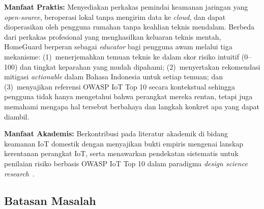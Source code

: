 \documentclass[conference]{IEEEtran}
\begin{document}
\textbf{Manfaat Praktis:} Menyediakan perkakas pemindai keamanan
jaringan yang \textit{open-source}, beroperasi lokal tanpa mengirim data
ke \textit{cloud}, dan dapat dioperasikan oleh pengguna rumahan tanpa
keahlian teknis mendalam. Berbeda dari perkakas profesional yang
menghasilkan keluaran teknis mentah, HomeGuard berperan sebagai
\textit{educator} bagi pengguna awam melalui tiga mekanisme:
(1)~menerjemahkan temuan teknis ke dalam skor risiko intuitif (0--100)
dan tingkat keparahan yang mudah dipahami;
(2)~menyertakan rekomendasi mitigasi \textit{actionable} dalam Bahasa
Indonesia untuk setiap temuan; dan
(3)~menyajikan referensi OWASP IoT Top 10 secara kontekstual sehingga
pengguna tidak hanya mengetahui bahwa perangkat mereka rentan, tetapi
juga memahami mengapa hal tersebut berbahaya dan langkah konkret apa
yang dapat diambil.

\textbf{Manfaat Akademis:} Berkontribusi pada literatur akademik di
bidang keamanan IoT domestik dengan menyajikan bukti empiris mengenai
lanskap kerentanan perangkat IoT, serta menawarkan pendekatan sistematis
untuk penilaian risiko berbasis OWASP IoT Top 10 dalam paradigma
\textit{design science research}~\cite{hevner2004}.

\subsection{Batasan Masalah}
\end{document}
